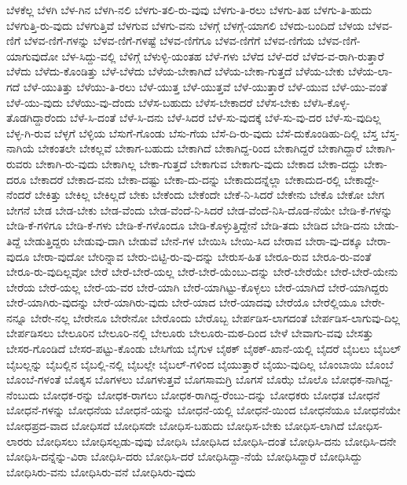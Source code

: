 {ಬೆಳಕೆಲ್ಲ
ಬೆಳಗಿ
ಬೆಳ-ಗಿನ
ಬೆಳಗಿ-ನಲಿ
ಬೆಳಗು-ತಲಿ-ರು-ವುವು
ಬೆಳಗು-ತಿ-ರಲು
ಬೆಳಗು-ತಿಹ
ಬೆಳಗು-ತಿ-ಹುದು
ಬೆಳಗುತ್ತಿ-ರು-ವುದು
ಬೆಳಗುತ್ತಿವೆ
ಬೆಳಗುವ
ಬೆಳಗು-ವನು
ಬೆಳಗ್ಗೆ
ಬೆಳಗ್ಗೆ-ಯಾಗಲಿ
ಬೆಳದು-ಬಂದಿದೆ
ಬೆಳಯ
ಬೆಳವ-ಣಿಗೆ
ಬೆಳವ-ಣಿಗೆ-ಗಳನ್ನು
ಬೆಳವ-ಣಿಗೆ-ಗಳಷ್ಟೆ
ಬೆಳವ-ಣಿಗೆಗೂ
ಬೆಳವ-ಣಿಗೆಗೆ
ಬೆಳವ-ಣಿಗೆಯ
ಬೆಳವ-ಣಿಗೆ-ಯಾಗುವುದೋ
ಬೆಳ-ಸಿದ್ದು-ವಲ್ಲಿ
ಬೆಳಿಗ್ಗೆ
ಬೆಳುಳ್ಳಿ-ಯಂತಹ
ಬೆಳೆ-ಗಳು
ಬೆಳೆದ
ಬೆಳೆ-ದರೆ
ಬೆಳೆದ-ವ-ರಾಗಿ-ರುತ್ತಾರೆ
ಬೆಳೆದು
ಬೆಳೆದು-ಕೊಂಡಿತ್ತು
ಬೆಳೆ-ಬೆಳೆದು
ಬೆಳೆಯ-ಬೇಕಾಗಿದೆ
ಬೆಳೆಯ-ಬೇಕಾ-ಗುತ್ತದೆ
ಬೆಳೆಯ-ಬೇಕು
ಬೆಳೆಯ-ಲಾ-ಗದೆ
ಬೆಳೆ-ಯುತಿತ್ತು
ಬೆಳೆಯು-ತಿ-ರಲು
ಬೆಳೆ-ಯುತ್ತ
ಬೆಳೆ-ಯುತ್ತವೆ
ಬೆಳೆ-ಯುತ್ತಾರೆ
ಬೆಳೆ-ಯುವ
ಬೆಳೆ-ಯು-ವಂತೆ
ಬೆಳೆ-ಯು-ವುದು
ಬೆಳೆಯು-ವು-ದೆಂದು
ಬೆಳೆಸ-ಬಹುದು
ಬೆಳೆಸ-ಬೇಕಾದರೆ
ಬೆಳೆಸ-ಬೇಕು
ಬೆಳೆಸಿ-ಕೊಳ್ಳ-ತೊಡಗಿದ್ದಾರೆಂದು
ಬೆಳೆ-ಸಿ-ದಂತೆ
ಬೆಳೆ-ಸಿ-ದನು
ಬೆಳೆ-ಸಿದರೆ
ಬೆಳೆ-ಸು-ವುದಕ್ಕೆ
ಬೆಳೆ-ಸು-ವು-ದರ
ಬೆಳೆ-ಸು-ವುದಿಲ್ಲ
ಬೆಳ್ಳ-ಗಿ-ರುವ
ಬೆಳ್ಳಗೆ
ಬೆಳ್ಳಿಯ
ಬೆಸುಗೆ-ಗೊಂಡು
ಬೆಸು-ಗೆಯ
ಬೆಸೆ-ದಿ-ರು-ವುದು
ಬೆಸೆ-ದುಕೊಂಡಿಹು-ದಿಲ್ಲಿ
ಬೆಸ್ತ
ಬೆಸ್ತ-ನಾಗಿಯೆ
ಬೇಕಂತಲೇ
ಬೇಕಲ್ಲವೆ
ಬೇಕಾಗ-ಬಹುದು
ಬೇಕಾಗಿದೆ
ಬೇಕಾಗಿದ್ದ-ರಿಂದ
ಬೇಕಾಗಿದ್ದರೆ
ಬೇಕಾಗಿದ್ದಾರೆ
ಬೇಕಾಗಿ-ರುವರು
ಬೇಕಾಗಿ-ರು-ವುದು
ಬೇಕಾಗಿಲ್ಲ
ಬೇಕಾ-ಗುತ್ತದೆ
ಬೇಕಾಗುವ
ಬೇಕಾಗು-ವುದು
ಬೇಕಾದ
ಬೇಕಾ-ದದ್ದು
ಬೇಕಾ-ದರೂ
ಬೇಕಾದರೆ
ಬೇಕಾದ-ವನು
ಬೇಕಾ-ದಷ್ಟು
ಬೇಕಾ-ದು-ದನ್ನು
ಬೇಕಾದುದನ್ನೆಲ್ಲಾ
ಬೇಕಾದುದ-ರಲ್ಲಿ
ಬೇಕಾದ್ದೇ-ನೆಂದರೆ
ಬೇಕಿತ್ತು
ಬೇಕಿಲ್ಲ
ಬೇಕಿಲ್ಲದೆ
ಬೇಕು
ಬೇಕೆಂದು
ಬೇಕೆಂದೇ
ಬೇಕೆ-ನಿ-ಸಿದರೆ
ಬೇಕೇನು
ಬೇಕೊ
ಬೇಕೋ
ಬೇಗ
ಬೇಗನೆ
ಬೇಡ
ಬೇಡ-ಬೇಕು
ಬೇಡ-ವೆಂದು
ಬೇಡ-ವೆಂದೆ-ನಿ-ಸಿದರೆ
ಬೇಡ-ವೆಂದೆ-ನಿಸಿ-ದೊಡ-ನೆಯೇ
ಬೇಡಿ-ಕೆ-ಗಳನ್ನು
ಬೇಡಿ-ಕೆ-ಗಳಿಗೂ
ಬೇಡಿ-ಕೆ-ಗಳು
ಬೇಡಿ-ಕೆ-ಗಳೊಂದೂ
ಬೇಡಿ-ಕೊಳ್ಳುತ್ತಿದ್ದೇನೆ
ಬೇಡಿ-ತದು
ಬೇಡಿದ
ಬೇಡಿ-ದನು
ಬೇಡು-ತಿದ್ದೆ
ಬೇಡುತ್ತಿದ್ದರು
ಬೇಡುವು-ದಾಗಿ
ಬೇಡುವೆ
ಬೇನೆ-ಗಳ
ಬೇಯಿಸಿ
ಬೇಯಿ-ಸಿದ
ಬೇರಾವ
ಬೇರಾ-ವು-ದಕ್ಕೂ
ಬೇರಾ-ವುದೂ
ಬೇರಾ-ವುದೋ
ಬೇರಿನ್ನಾವ
ಬೇರು-ಬಿಟ್ಟಿ-ರು-ವು-ದನ್ನು
ಬೇರುಸ-ಹಿತ
ಬೇರೂ-ರುವ
ಬೇರೂ-ರು-ವಂತೆ
ಬೇರೂ-ರು-ವುದಿಲ್ಲವೋ
ಬೇರೆ
ಬೇರೆ-ಬೇರೆ-ಯಲ್ಲ
ಬೇರೆ-ಬೇರೆ-ಯೆಂಬು-ದನ್ನು
ಬೇರೆ-ಬೇರೆಯೇ
ಬೇರೆ-ಬೇರೆ-ಯೇನು
ಬೇರೆಯ
ಬೇರೆ-ಯಲ್ಲ
ಬೇರೆ-ಯ-ವರ
ಬೇರೆ-ಯಾಗಿ
ಬೇರೆ-ಯಾಗಿಟ್ಟು-ಕೊಳ್ಳಲು
ಬೇರೆ-ಯಾಗಿದೆ
ಬೇರೆ-ಯಾಗಿದ್ದರು
ಬೇರೆ-ಯಾಗಿರು-ವುದನ್ನು
ಬೇರೆ-ಯಾಗಿರು-ವುದು
ಬೇರೆ-ಯಾದ
ಬೇರೆ-ಯಾದವು
ಬೇರೆಯೊ
ಬೇರೆಲ್ಲಿಯೂ
ಬೇರೇ-ನನ್ನೂ
ಬೇರೇ-ನಲ್ಲ
ಬೇರೇನೂ
ಬೇರೇನೋ
ಬೇರೊಂದು
ಬೇರೊಬ್ಬ
ಬೇರ್ಪಡಿಸ-ಲಾಗದಂತೆ
ಬೇರ್ಪಡಿಸ-ಲಾಗುವು-ದಿಲ್ಲ
ಬೇರ್ಪಡಿಸಲು
ಬೇಲೂರಿನ
ಬೇಲೂರಿ-ನಲ್ಲಿ
ಬೇಲೂರು
ಬೇಲೂರು-ಮಠ-ದಿಂದ
ಬೇಳೆ
ಬೇವಾಗು-ವವು
ಬೇಸತ್ತು
ಬೇಸರ-ಗೊಂಡಿದೆ
ಬೇಸರ-ಪಟ್ಟು-ಕೊಂಡು
ಬೇಸಿಗೆಯ
ಬೈಗುಳ
ಬೈಠಕ್
ಬೈಠಕ್-ಖಾನೆ-ಯಲ್ಲಿ
ಬೈದರೆ
ಬೈಬಲು
ಬೈಬಲ್
ಬೈಬಲ್ಲನ್ನು
ಬೈಬಲ್ಲಿನ
ಬೈಬಲ್ಲಿ-ನಲ್ಲಿ
ಬೈಬಲ್ಲೇ
ಬೈಬಲ್-ಗಳಿಂದ
ಬೈಯುತ್ತಾರೆ
ಬೈಯು-ವುದಿಲ್ಲ
ಬೊಂಬಾಯಿ
ಬೊಂಬೆ
ಬೊಂಬೆ-ಗಳಂತೆ
ಬೊಕ್ಕಸ
ಬೊಗಳಲು
ಬೊಗಳುತ್ತವೆ
ಬೊಗಸಾಮಗ್ರಿ
ಬೊಗಸೆ
ಬೊಝೆ
ಬೊಲೊ
ಬೋಧಕ-ನಾಗಿದ್ದ-ನೆಂಬುದು
ಬೋಧಕ-ರನ್ನು
ಬೋಧಕ-ರಾಗಲು
ಬೋಧಕ-ರಾಗಿದ್ದ-ರೆಂಬು-ದನ್ನು
ಬೋಧಕರು
ಬೋಧತ
ಬೋಧನೆ
ಬೋಧನೆ-ಗಳನ್ನು
ಬೋಧನೆಯ
ಬೋಧನೆ-ಯನ್ನು
ಬೋಧನೆ-ಯಲ್ಲಿ
ಬೋಧನೆ-ಯಿಂದ
ಬೋಧನೆಯೂ
ಬೋಧನೆಯೇ
ಬೋಧಪ್ರದ-ವಾದ
ಬೋಧಿಸದೆ
ಬೋಧಿಸದೇ
ಬೋಧಿಸ-ಬಹುದು
ಬೋಧಿಸ-ಬೇಕು
ಬೋಧಿಸ-ಲಾಗಿದೆ
ಬೋಧಿಸ-ಲಾರರು
ಬೋಧಿಸಲು
ಬೋಧಿಸಲ್ಪಡು-ವುವು
ಬೋಧಿಸಿ
ಬೋಧಿಸಿದ
ಬೋಧಿಸಿ-ದಂತೆ
ಬೋಧಿಸಿ-ದನು
ಬೋಧಿಸಿ-ದನೇ
ಬೋಧಿಸಿ-ದನ್ನೆನ್ನು-ವಿರಾ
ಬೋಧಿಸಿ-ದರು
ಬೋಧಿಸಿ-ದರೆ
ಬೋಧಿಸಿದ್ದಾ-ನೆಯೆ
ಬೋಧಿಸಿದ್ದಾರೆ
ಬೋಧಿಸಿದ್ದು
ಬೋಧಿಸಿರು-ವನು
ಬೋಧಿಸಿರು-ವನೆ
ಬೋಧಿಸಿರು-ವುದು
}
